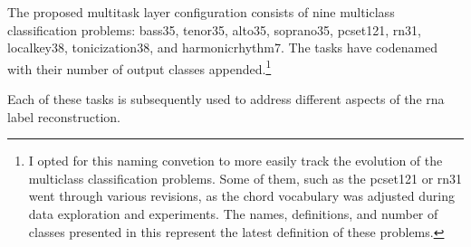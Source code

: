 
The proposed multitask layer configuration consists of nine
multiclass classification problems: \gls{bass35},
\gls{tenor35}, \gls{alto35}, \gls{soprano35},
\gls{pcset121}, \gls{rn31}, \gls{localkey38},
\gls{tonicization38}, and \gls{harmonicrhythm7}. The tasks
have codenamed with their number of output classes
appended.\footnote{I opted for this naming convetion to more
easily track the evolution of the multiclass classification
problems. Some of them, such as the \gls{pcset121} or
\gls{rn31} went through various revisions, as the chord
vocabulary was adjusted during data exploration and
experiments. The names, definitions, and number of classes
presented in this \thesisdiss{} represent the latest
definition of these problems.}

Each of these tasks is subsequently used to address
different aspects of the \gls{rna} label reconstruction.
